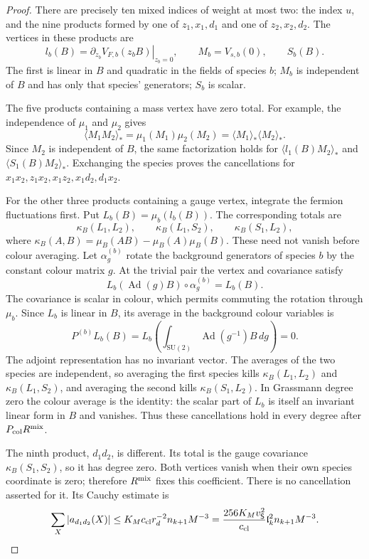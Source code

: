 \documentclass[11pt,letterpaper,reqno]{amsart}
\theoremstyle{definition}
\theoremstyle{remark}
\begin{document}
\begin{proof}
There are precisely ten mixed indices of weight at most
two: the index $u$, and the nine products formed by one
of $z_1,x_1,d_1$ and one of $z_2,x_2,d_2$.
The vertices in these products are
\[
 l_b(B)=\left.\partial_{z_b}V_{F,b}(z_bB)\right|_{z_b=0},
 \qquad M_b=V_{s,b}(0),\qquad S_b(B).
\]
The first is linear in $B$ and quadratic in the fields
of species $b$; $M_b$ is independent of $B$ and has only
that species' generators; $S_b$ is scalar.

The five products containing a mass vertex have zero
total.  For example, the independence of $\mu_1$ and
$\mu_2$ gives
\[
 \langle M_1M_2\rangle_*
       =\mu_1(M_1)\mu_2(M_2)
       =\langle M_1\rangle_*\langle M_2\rangle_*.
\]
Since $M_2$ is independent of $B$, the same factorization
holds for $\langle l_1(B)M_2\rangle_*$ and
$\langle S_1(B)M_2\rangle_*$.  Exchanging the species
proves the cancellations for
$x_1x_2,z_1x_2,x_1z_2,x_1d_2,d_1x_2$.

For the other three products containing a gauge vertex,
integrate the fermion fluctuations first.  Put
$L_b(B)=\mu_b(l_b(B))$.  The corresponding totals are
\[
 \kappa_B(L_1,L_2),\qquad
 \kappa_B(L_1,S_2),\qquad
 \kappa_B(S_1,L_2),
\]
where $\kappa_B(A,B)=\mu_B(AB)-\mu_B(A)\mu_B(B)$.
These need not vanish before colour averaging.
Let $\alpha_g^{(b)}$ rotate the background generators
of species $b$ by the constant colour matrix $g$.
At the trivial pair the vertex and covariance satisfy
\[
 L_b(\operatorname{Ad}(g)B)\circ\alpha_g^{(b)}=L_b(B).
\]
The covariance is scalar in colour, which permits
commuting the rotation through $\mu_b$.
Since $L_b$ is linear in $B$, its average in the
background colour variables is
\[
 P^{(b)}L_b(B)
 =L_b\left(\int_{\mathrm{SU}(2)}
                         \operatorname{Ad}(g^{-1})B\,dg\right)=0.
\]
The adjoint representation has no invariant vector.
The averages of the two species are independent, so
averaging the first species kills $\kappa_B(L_1,L_2)$
and $\kappa_B(L_1,S_2)$, and averaging the second kills
$\kappa_B(S_1,L_2)$.  In Grassmann degree zero the
colour average is the identity: the scalar part of
$L_b$ is itself an invariant linear form in $B$ and
vanishes.  Thus these cancellations hold in every
degree after $P_{\rm col}R^{\rm mix}$.

The ninth product, $d_1d_2$, is different.  Its total
is the gauge covariance $\kappa_B(S_1,S_2)$, so it
has degree zero.  Both vertices vanish when their
own species coordinate is zero; therefore $R^{\rm mix}$
fixes this coefficient.  There is no cancellation
asserted for it.  Its Cauchy estimate is
\begin{equation}\label{eq:qcdm2-two-scalar-coefficient}
 \sum_X|a_{d_1d_2}(X)|
 \le K_Mc_{\rm cl}r_d^{-2}n_{k+1}M^{-3}
 =\frac{256K_Mv_{\mathsf S}^2}{c_{\rm cl}}
                  \mathfrak l_k^2n_{k+1}M^{-3}.
\end{equation}


\end{proof}
\end{document}

